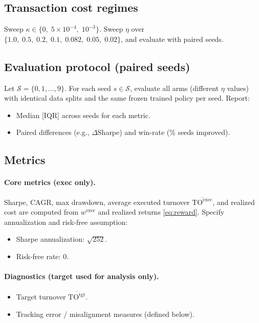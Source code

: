 \documentclass[10pt,twocolumn]{article}
\newcommand{\wexec}{w^{\mathrm{exec}}}
\newcommand{\TOexec}{\mathrm{TO}^{\mathrm{exec}}}
\newcommand{\TOtgt}{\mathrm{TO}^{\mathrm{tgt}}}
\newcommand{\kappaTC}{\kappa}
\begin{document}
\subsection{Transaction cost regimes}
Sweep $\kappaTC\in\{0,\;5\times10^{-4},\;10^{-3}\}$. Sweep $\eta$ over $\{1.0,\;0.5,\;0.2,\;0.1,\;0.082,\;0.05,\;0.02\}$, and evaluate with paired seeds.

\subsection{Evaluation protocol (paired seeds)}
Let $\mathcal{S}=\{0,1,\dots,9\}$. For each seed $s\in\mathcal{S}$, evaluate all arms (different $\eta$ values) with identical data splits and the same frozen trained policy per seed.
Report:
\begin{itemize}[leftmargin=*,itemsep=1pt]
\item Median [IQR] across seeds for each metric.
\item Paired differences (e.g., $\Delta$Sharpe) and win-rate (\% seeds improved).
\end{itemize}

\subsection{Metrics}
\paragraph{Core metrics (exec only).}
Sharpe, CAGR, max drawdown, average executed turnover $\overline{\TOexec}$, and realized cost are computed from $\wexec$ and realized returns \eqref{eq:reward}. Specify annualization and risk-free assumption:
\begin{itemize}[leftmargin=*,itemsep=1pt]
\item Sharpe annualization: $\sqrt{252}$.
\item Risk-free rate: 0.
\end{itemize}

\paragraph{Diagnostics (target used for analysis only).}
\begin{itemize}[leftmargin=*,itemsep=1pt]
\item Target turnover $\overline{\TOtgt}$.
\item Tracking error / misalignment measures (defined below).
\end{itemize}
\end{document}
